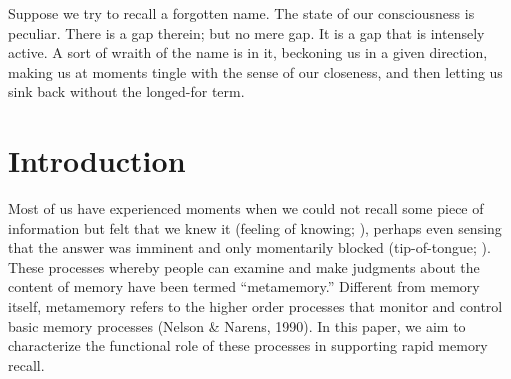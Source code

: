 \begin{savequote}[75mm]
Suppose we try to recall a forgotten name. The state of our consciousness is peculiar. There is a gap therein; but no mere gap. It is a gap that is intensely active. A sort of wraith of the name is in it, beckoning us in a given direction, making us at moments tingle with the sense of our closeness, and then letting us sink back without the longed-for term.
\end{savequote}





\label{sec:memory}


\newcommand{\citepnelson}{(Nelson \& Narens, 1990)}
\newcommand{\citetnelson}{Nelson \& Narens (1990)}
\newcommand{\citealpnelson}{Nelson \& Narens, 1990}
\nocite{nelson1990metamemory}

\section{Introduction}
Most of us have experienced moments when we could not recall some piece of information but felt that we knew it (feeling of knowing; \citealp{hart1965memory}), perhaps even sensing that the answer was imminent and only momentarily blocked (tip-of-tongue; \citealp{brown1966tip}). These processes whereby people can examine and make judgments about the content of memory have been termed ``metamemory.'' Different from memory itself, metamemory refers to the higher order processes that monitor and control basic memory processes \citepnelson{}. In this paper, we aim to characterize the functional role of these processes in supporting rapid memory recall.

